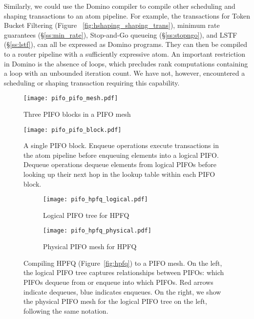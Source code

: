 Similarly, we could use the Domino compiler to compile other scheduling and
shaping transactions to an atom pipeline.  For example, the transactions for
Token Bucket Filtering (Figure ~\ref{fig:hshaping_shaping_trans}), minimum rate
guarantees (\S\ref{ss:min_rate}), Stop-and-Go queueing (\S\ref{ss:stopngo}),
and LSTF (\S\ref{ss:lstf}), can all be expressed as Domino programs. They can
then be compiled to a router pipeline with a sufficiently expressive
atom. An important restriction in Domino is the absence of loops, which
precludes rank computations containing a loop with an unbounded iteration
count. We have not, however, encountered a scheduling or shaping transaction
requiring this capability.

\begin{figure}[!t]
  \centering
  \texttt{[image: pifo\_pifo\_mesh.pdf]}
  \caption{Three PIFO blocks in a PIFO mesh}
  \label{fig:mesh}
\end{figure}

\begin{figure}[!t]
  \centering
  \texttt{[image: pifo\_pifo\_block.pdf]}
  \caption{A single PIFO block. Enqueue operations execute transactions in the
atom pipeline before enqueuing elements into a logical PIFO. Dequeue operations
dequeue elements from logical PIFOs before looking up their next hop in the
lookup table within each PIFO block.} 
  \label{fig:block}
\end{figure}

\begin{figure*}[!t]
  \begin{subfigure}[b]{0.5\textwidth}
  \begin{center}
  \texttt{[image: pifo\_hpfq\_logical.pdf]}
  \caption{Logical PIFO tree for HPFQ}
  \label{fig:hpfq_path}
  \end{center}
  \end{subfigure}
  \begin{subfigure}[b]{0.5\textwidth}
  \begin{center}
  \texttt{[image: pifo\_hpfq\_physical.pdf]}
  \caption{Physical PIFO mesh for HPFQ}
  \label{fig:hpfq_mesh}
  \end{center}
  \end{subfigure}
  \caption{Compiling HPFQ (Figure~\ref{fig:hpfq}) to a PIFO mesh. On the left,
  the logical PIFO tree captures relationships between PIFOs: which PIFOs dequeue from
  or enqueue into which PIFOs. Red arrows indicate dequeues, blue indicates
  enqueues.  On the right, we show the physical PIFO mesh for the logical PIFO
  tree on the left, following the same notation.}
  \label{fig:hpfq_compiling}
\end{figure*}

